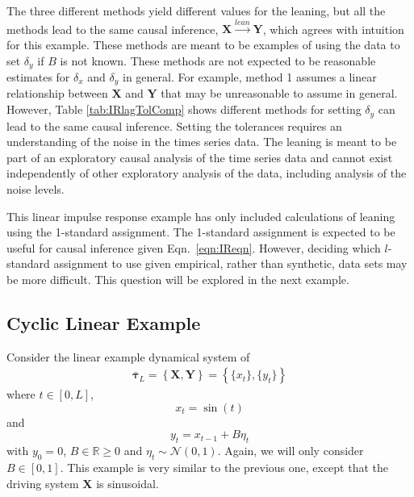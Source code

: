 \documentclass[a4paper,11pt,twocolumn]{article}
\begin{document}
The three different methods yield different values for the leaning, but all the methods lead to the same causal inference, $\mathbf{X}\xrightarrow{lean}\mathbf{Y}$, which agrees with intuition for this example.  These methods are meant to be examples of using the data to set $\delta_y$ if $B$ is not known.  These methods are not expected to be reasonable estimates for $\delta_x$ and $\delta_y$ in general.  For example, method 1 assumes a linear relationship between $\mathbf{X}$ and $\mathbf{Y}$ that may be unreasonable to assume in general.  However, Table \ref{tab:IRlagTolComp} shows different methods for setting $\delta_y$ can lead to the same causal inference.  Setting the tolerances requires an understanding of the noise in the times series data.  The leaning is meant to be part of an exploratory causal analysis of the time series data and cannot exist independently of other exploratory analysis of the data, including analysis of the noise levels.  

This linear impulse response example has only included calculations of leaning using the 1-standard assignment.  The 1-standard assignment is expected to be useful for causal inference given Eqn.\ \ref{eqn:IReqn}.  However, deciding which $l$-standard assignment to use given empirical, rather than synthetic, data sets may be more difficult.  This question will be explored in the next example.

\subsection{Cyclic Linear Example}
Consider the linear example dynamical system of
\begin{eqnarray}
\label{eqn:IReqn}
\bar{\mathbf{\tau}}_L = \left\{\mathbf{X},\mathbf{Y}\right\} = \left\{\{x_t\},\{y_t\}\right\}
\end{eqnarray}
where $t\in[0,L]$,
\begin{equation*}
x_t = \sin(t)
\end{equation*}
and
\begin{equation*}
y_t = x_{t-1} + B\eta_t
\end{equation*}
with $y_0 = 0$, $B\in\mathbb{R}\ge 0$ and $\eta_t\sim\mathcal{N}\left(0,1\right)$.  Again, we will only consider $B\in[0,1]$.  This example is very similar to the previous one, except that the driving system $\mathbf{X}$ is sinusoidal.
\end{document}
